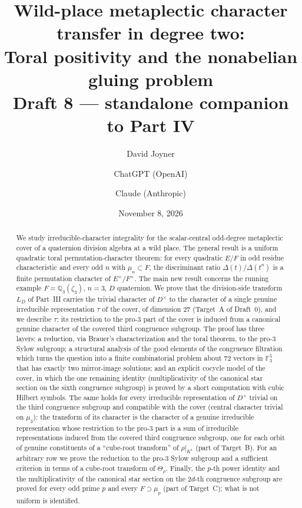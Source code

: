 \documentclass[11pt]{article}
\title{Wild-place metaplectic character transfer in degree two:\\
Toral positivity and the nonabelian gluing problem\\[0.4em]
\normalsize Draft 8 --- standalone companion to Part IV}
\author{David Joyner \and ChatGPT (OpenAI) \and Claude (Anthropic)}
\date{November 8, 2026}
\newcommand{\Q}{\mathbb Q}
\newcommand{\Fq}{\mathbb F}
\theoremstyle{plain}
\theoremstyle{definition}
\begin{document}
\maketitle
\begin{abstract}
We study irreducible-character integrality for the scalar-central
odd-degree metaplectic cover of a quaternion division algebra at a
wild place.  The general result is a uniform quadratic toral
permutation-character theorem: for every quadratic $E/F$ in odd
residue characteristic and every odd $n$ with $\mu_n\subset F$, the
discriminant ratio $\Delta(t)/\Delta(t^n)$ is a finite permutation
character of $E^\times/F^\times$.  The main new result concerns the
running example $F=\Q_3(\zeta_3)$, $n=3$, $D$ quaternion.  We prove
that the division-side transform $L_D$ of Part~III carries the
trivial character of $D^\times$ to the character of a single genuine
irreducible representation $\tau$ of the cover, of dimension $27$
(Target~A of Draft~0), and we describe $\tau$: its restriction to the
pro-$3$ part of the cover is induced from a canonical genuine
character of the covered third congruence subgroup.  The proof has
three layers: a reduction, via Brauer's characterization and the
toral theorem, to the pro-$3$ Sylow subgroup; a structural analysis
of the good elements of the congruence filtration which turns the
question into a finite combinatorial problem about $72$ vectors in
$\Fq_3^5$ that has exactly two mirror-image solutions; and an
explicit cocycle model of the cover, in which the one remaining
identity (multiplicativity of the canonical star section on the sixth
congruence subgroup) is proved by a short computation with cubic
Hilbert symbols.  The same holds for every irreducible representation of $D^\times$
trivial on the third congruence subgroup and compatible with the cover
(central character trivial on $\mu_3$): the transform of its
character is the character of a genuine irreducible representation
whose restriction to the pro-$3$ part is a sum of irreducible
representations induced from the covered third congruence subgroup,
one for each orbit of genuine constituents of a ``cube-root transform''
of $\rho|_{K^1}$ (part of Target~B).  For an arbitrary row
we prove the reduction to the pro-$3$ Sylow subgroup and a sufficient
criterion in terms of a cube-root transform of $\Theta_\rho$.  Finally,
the $p$-th power identity and the multiplicativity of the canonical star
section on the $2d$-th congruence subgroup are proved for every odd prime
$p$ and every $F\supset\mu_p$ (part of Target~C); what is not uniform is
identified.
\end{abstract}
\tableofcontents
\end{document}

